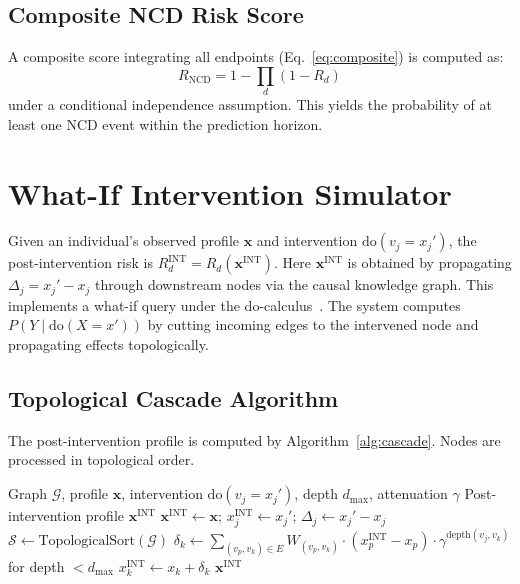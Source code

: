 \documentclass[runningheads]{llncs}
\begin{document}
\subsection{Composite NCD Risk Score}\label{sec:composite}

A composite score integrating all endpoints (Eq.~\ref{eq:composite})
is computed as:
\begin{equation}\label{eq:composite}
R_{\mathrm{NCD}} = 1 - \prod_{d} (1 - R_d)
\end{equation}
under a conditional independence assumption.
This yields the probability of at least one NCD event within the
prediction horizon.

\section{What-If Intervention Simulator}\label{sec:whatif}

Given an individual's observed profile $\mathbf{x}$ and intervention
$\mathrm{do}(v_j = x_j')$, the post-intervention risk is
$R_d^{\mathrm{INT}} = R_d(\mathbf{x}^{\mathrm{INT}})$.
Here $\mathbf{x}^{\mathrm{INT}}$ is obtained by propagating
$\Delta_j = x_j' - x_j$ through downstream nodes via the causal
knowledge graph.
This implements a what-if query under the
do-calculus~\cite{pearl2009causality}.
The system computes $P(Y \mid \mathrm{do}(X = x'))$ by cutting
incoming edges to the intervened node and propagating effects
topologically.

\subsection{Topological Cascade Algorithm}\label{sec:cascade}

The post-intervention profile is computed by
Algorithm~\ref{alg:cascade}.
Nodes are processed in topological order.

\begin{algorithm}[t]
\caption{Topological Intervention Cascade}
\label{alg:cascade}
\begin{algorithmic}[1]
\REQUIRE Graph $\mathcal{G}$, profile $\mathbf{x}$, intervention
  $\mathrm{do}(v_j = x_j')$, depth $d_{\max}$, attenuation $\gamma$
\ENSURE Post-intervention profile $\mathbf{x}^{\mathrm{INT}}$
\STATE $\mathbf{x}^{\mathrm{INT}} \leftarrow \mathbf{x}$;
  $x_j^{\mathrm{INT}} \leftarrow x_j'$;
  $\Delta_j \leftarrow x_j' - x_j$
\STATE $\mathcal{S} \leftarrow \text{TopologicalSort}(\mathcal{G})$
  \STATE $\delta_k \leftarrow \sum_{(v_p, v_k) \in E} W_{(v_p,v_k)} \cdot (x_p^{\mathrm{INT}} - x_p) \cdot \gamma^{\text{depth}(v_j,v_k)}$ for depth $< d_{\max}$
  \STATE $x_k^{\mathrm{INT}} \leftarrow x_k + \delta_k$
\ENDFOR
\RETURN $\mathbf{x}^{\mathrm{INT}}$
\end{algorithmic}
\end{algorithm}
\end{document}
